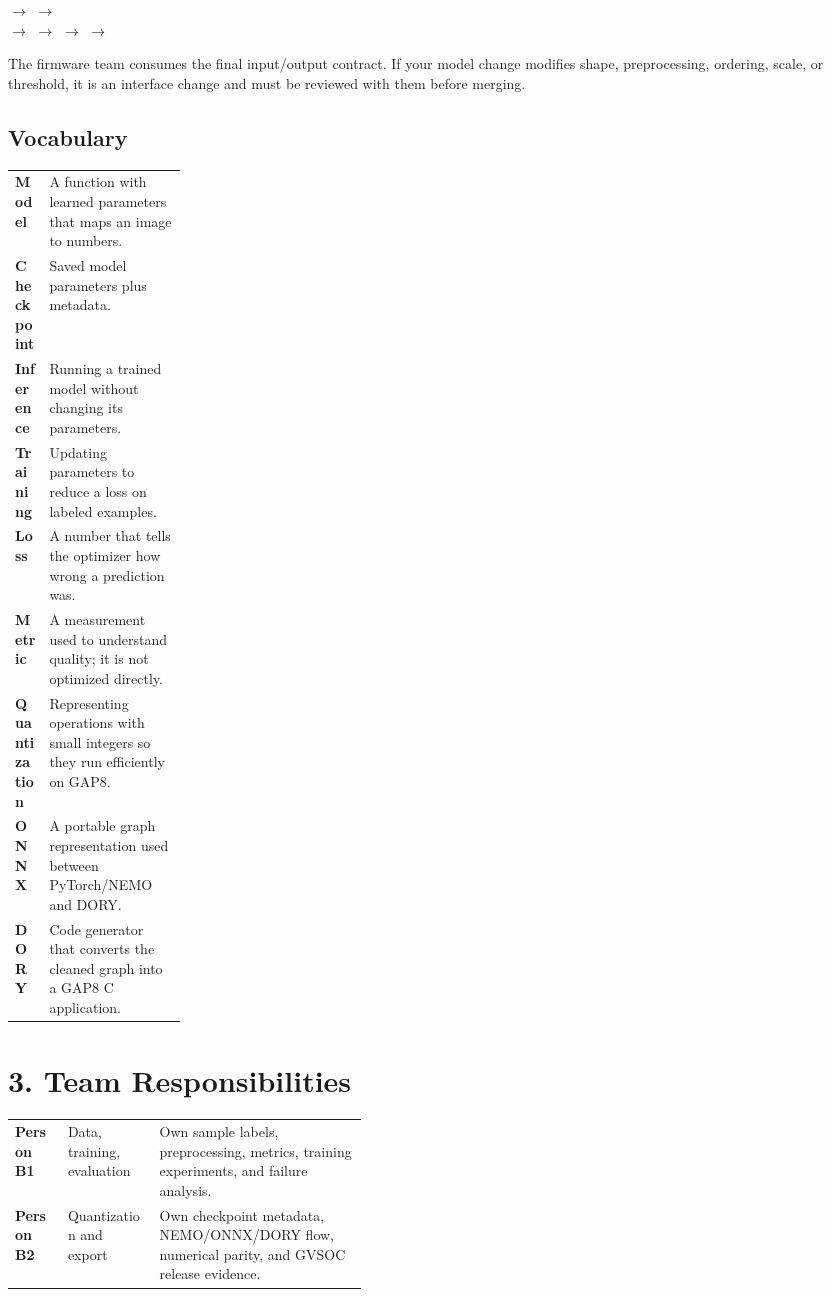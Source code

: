 \documentclass[11pt]{article}
\begin{document}
\begin{center}
 $\longrightarrow$
 $\longrightarrow$
\\[6pt]
$\longrightarrow$  $\longrightarrow$
 $\longrightarrow$
 $\longrightarrow$
\end{center}

The firmware team consumes the final input/output contract. If your model change modifies shape, preprocessing, ordering, scale, or threshold, it is an interface change and must be reviewed with them before merging.

\subsection{Vocabulary}

\begin{tabularx}{\linewidth}{>{\bfseries}p{0.20\linewidth}X}
Model & A function with learned parameters that maps an image to numbers. \\
Checkpoint & Saved model parameters plus metadata. \\
Inference & Running a trained model without changing its parameters. \\
Training & Updating parameters to reduce a loss on labeled examples. \\
Loss & A number that tells the optimizer how wrong a prediction was. \\
Metric & A measurement used to understand quality; it is not optimized directly. \\
Quantization & Representing operations with small integers so they run efficiently on GAP8. \\
ONNX & A portable graph representation used between PyTorch/NEMO and DORY. \\
DORY & Code generator that converts the cleaned graph into a GAP8 C application. \\
\end{tabularx}

\section{3. Team Responsibilities}

\begin{tabularx}{\linewidth}{>{\bfseries}p{0.15\linewidth}p{0.26\linewidth}X}
Person B1 & Data, training, evaluation & Own sample labels, preprocessing, metrics, training experiments, and failure analysis. \\
Person B2 & Quantization and export & Own checkpoint metadata, NEMO/ONNX/DORY flow, numerical parity, and GVSOC release evidence. \\
\end{tabularx}
\end{document}
